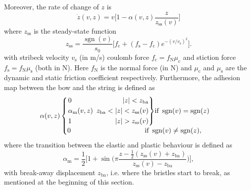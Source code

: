 \documentclass[twoside,a4paper]{article}
\newenvironment{rcases}
  {\left.\begin{alignedat}{2}}
  {\end{alignedat}\right\rbrace}
\DeclareMathOperator{\sgn}{sgn}
\begin{document}
Moreover, the rate of change of $z$ is
\begin{equation}\label{eq:zdot}
    \dot z(v, z) = v\bigg[1-\alpha(v, z)\frac{z}{z_\text{ss}(v)}\bigg]
\end{equation}
where $z_\text{ss}$ is the steady-state function
\begin{equation}
    z_\text{ss} = \frac{\sgn(v)}{s_0}\Big[f_\text{c}+(f_\text{s}-f_\text{c})e^{-(v/v_\text{s})^2}\Big].
\end{equation}
with stribeck velocity $v_\text{s}$ (in m/s) coulomb force $f_\text{c} = f_\text{N}\mu_\text{c}$ and stiction force $f_\text{s} = f_\text{N}\mu_\text{s}$ (both in N). Here $f_\text{N}$ is the normal force (in N) and $\mu_\text{c}$ and $\mu_\text{s}$ are the dynamic and static friction coefficient respectively. 
Furthermore, the adhesion map between the bow and the string is defined as
\begin{equation}\label{eq:adhesionMap}
\alpha(v, z) 
    \begin{cases}
    \begin{rcases}
        &0 & |z| < z_\text{ba}\\
       &\alpha_\text{m}(v,z)&\ \, z_\text{ba}<|z|<z_\text{ss}(v)\\        &1 &|z|>z_\text{ss}(v)
        \end{rcases}\text{if}\  \sgn(v)=\sgn(z)\\
        0\hspace{107pt}\text{if}\  \sgn(v)\neq\sgn(z),
    \end{cases}
\end{equation}
where the transition between the elastic and plastic behaviour is defined as
\begin{equation}
    \alpha_\text{m} = \frac{1}{2}\bigg[1+\sin\bigg(\pi\frac{z-\frac{1}{2}(z_\text{ss}(v)+z_\text{ba})}{z_\text{ss}(v)-z_\text{ba}}\bigg)\bigg],
\end{equation}
with break-away displacement $z_\text{ba}$, i.e. where the bristles start to break, as mentioned at the beginning of this section.
\end{document}
